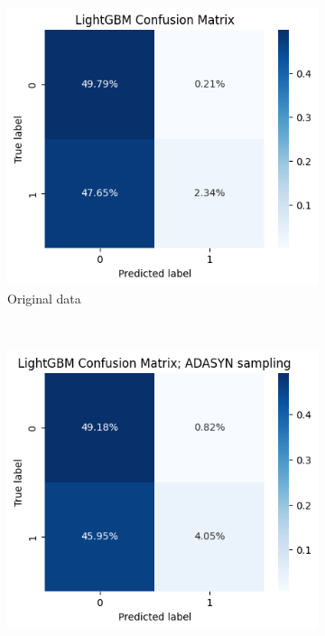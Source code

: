\documentclass[runningheads]{llncs}
\begin{document}
\begin{figure}[htbp]
    \centering
    \begin{subfigure}[t]{0.3\textwidth}
        \centering
        \includegraphics[width=0.99\linewidth]{images/exp2_matrix.png}
        \caption{Original data}
        \label{Fig:exp2_matrix1}
    \end{subfigure}%
    ~ 
    \begin{subfigure}[t]{0.3\textwidth}
        \centering
        \includegraphics[width=0.99\linewidth]{images/exp2_matrix_adasyn.png}

\end{subfigure}
\end{figure}
\end{document}
